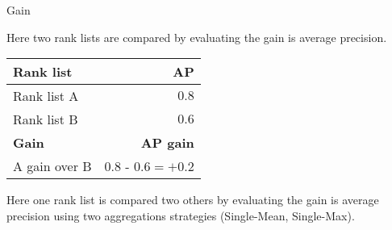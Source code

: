 \begin{example}
  \centering
  \caption{Gain}
  \label{ex:gain}

  \begin{subexample}{\linewidth}
    \centering

    Here two rank lists are compared by evaluating the gain is average precision.

    \vspace{0.2cm}

    \begin{tabular}{l r}
      \toprule
      \textbf{Rank list} & \textbf{AP} \\
      \midrule
      Rank list A & $0.8$ \\
      Rank list B & $0.6$ \\
      \midrule
      \textbf{Gain} & \textbf{AP gain} \\
      A gain over B & $0.8$ - $0.6 = +0.2$ \\
      \bottomrule
    \end{tabular}
  \end{subexample}

  \vspace{0.5cm}

  \begin{subexample}{\linewidth}
    \centering

    Here one rank list is compared two others by evaluating the gain is average precision using two aggregations strategies (Single-Mean, Single-Max).

    \vspace{0.2cm}

  \end{subexample}

\end{example}
